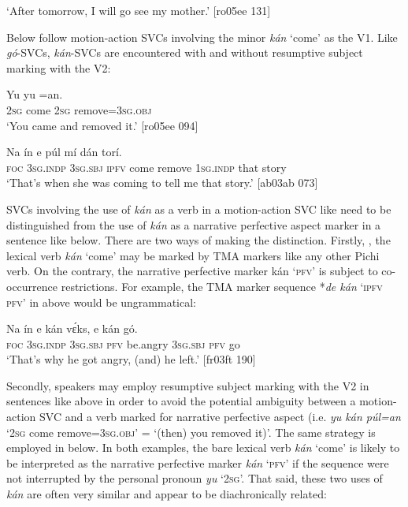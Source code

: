 \glt ‘After tomorrow, I will go see my mother.’ [ro05ee 131]
\z

Below follow motion-action SVCs involving the minor \textit{kán} ‘come’ as the V1. Like \textit{gó}{}-SVCs, \textit{kán}{}-SVCs are encountered with  and without  resumptive subject marking with the V2:


\ea%
    \label{ex:key:1552}
    \gll Yu      yu  =an.\\
\textsc{2sg}  come  \textsc{2sg}  remove=\textsc{3sg.obj}\\

\glt ‘You came and removed it.’ [ro05ee 094]
\z


\ea%
    \label{ex:key:1553}
    \gll Na  ín    e          púl    mí    dán  torí.\\
\textsc{foc}  \textsc{3sg.indp}  \textsc{3sg.sbj}  \textsc{ipfv}  come  remove  \textsc{1sg.indp}  that  story\\

\glt ‘That’s when she was coming to tell me that story.’ [ab03ab 073]
\z

SVCs involving the use of \textit{kán} as a verb in a motion-action SVC like  need to be distinguished from the use of \textit{kán} as a narrative perfective aspect marker in a sentence like  below. There are two ways of making the distinction. Firstly, , the lexical verb \textit{kán} ‘come’ may be marked by TMA markers like any other Pichi verb. On the contrary, the narrative perfective marker kán ‘\textsc{pfv}’ is subject to co-occurrence restrictions. For example, the TMA marker sequence *\textit{de kán} ‘\textsc{ipfv} \textsc{pfv}’ in  above would be ungrammatical:


\ea%
    \label{ex:key:1554}
    \gll   Na  ín    e    kán  vɛ́ks,    e    kán  gó.\\
\textsc{foc}  \textsc{3sg.indp}  \textsc{3sg.sbj}  \textsc{pfv}  be.angry    \textsc{3sg.sbj}  \textsc{pfv}  go\\

\glt ‘That’s why he got angry, (and) he left.’ [fr03ft 190]
\z

Secondly, speakers may employ resumptive subject marking with the V2 in sentences like  above in order to avoid the potential ambiguity between a motion-action SVC and a verb marked for narrative perfective aspect (i.e. \textit{yu kán púl=an} ‘\textsc{2sg} come remove=\textsc{3sg.obj}’ = ‘(then) you removed it)’. The same strategy is employed in  below. In both examples, the bare lexical verb \textit{kán} ‘come’ is likely to be interpreted as the narrative perfective marker \textit{kán} ‘\textsc{pfv’} if the sequence were not interrupted by the personal pronoun \textit{yu} ‘\textsc{2sg}’. That said, these two uses of \textit{kán} are often very similar and appear to be diachronically related:


